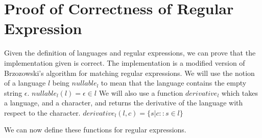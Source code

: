 \usepackage{biblatex}\section{Proof of Correctness of Regular Expression}\label{sec:proof-of-correctness-of-regular-expression}




Given the definition of languages and regular expressions, we can prove that the implementation given is correct.
The implementation is a modified version of Brzozowski's\cite{brzozowski} algorithm for matching regular expressions.
We will use the notion of a language $l$ being $nullable_l$ to mean that the language contains the empty string $\epsilon$.
$nullable_l(l) = \epsilon \in l$
We will also use a function $derivative_l$ which takes a language, and a character, and returns the derivative of the language with respect to the character.
$derivative_l(l, c) = \{s | c::s \in l\}$

We can now define these functions for regular expressions.
